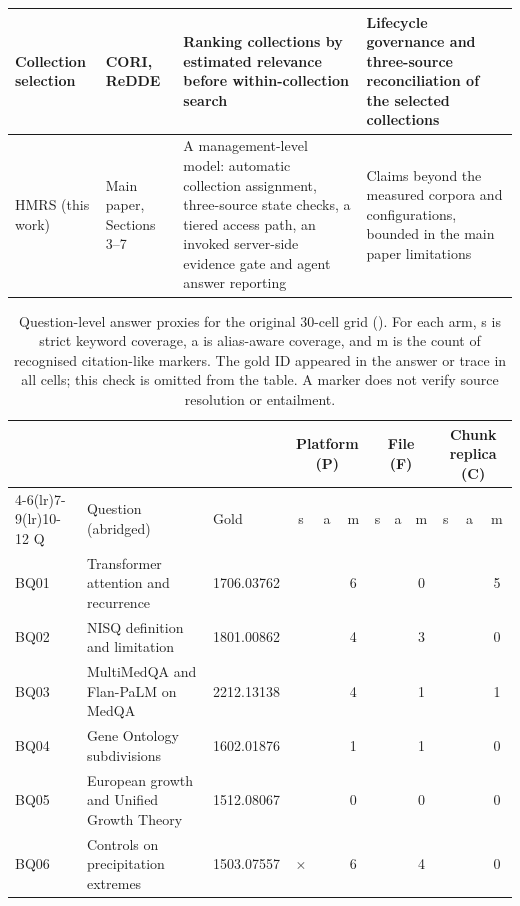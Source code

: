 \documentclass[final,5p,times,twocolumn]{elsarticle}
\newcommand{\yes}{\checkmark}\newcommand{\no}{--}
\begin{document}
\begin{table}[t]
\begin{tabular}{@{}>{\raggedright\arraybackslash}p{}>{\raggedright\arraybackslash}p{}>{\raggedright\arraybackslash}p{}>{\raggedright\arraybackslash}p{}@{}}
Collection selection & CORI, ReDDE & Ranking collections by estimated relevance before within-collection search & Lifecycle governance and three-source reconciliation of the selected collections\\
\midrule
HMRS (this work) & Main paper, Sections 3--7 & A management-level model: automatic collection assignment, three-source state checks, a tiered access path, an invoked server-side evidence gate and agent answer reporting & Claims beyond the measured corpora and configurations, bounded in the main paper limitations\\
\bottomrule
\end{tabular}
\end{table}

\begin{table}[t]
\centering
\small
\setlength{\tabcolsep}{3pt}
\caption{Question-level answer proxies for the original 30-cell grid
(\protect{}). For each arm, s is strict
keyword coverage, a is alias-aware coverage, and m is the count of
recognised citation-like markers. The gold ID appeared in the answer or
trace in all cells; this check is omitted from the table. A marker does not
verify source resolution or entailment.}
\label{tab:s-answer-grid}
\begin{tabular}{@{}l>{\raggedright\arraybackslash}p{}l*{9}{c}@{}}
\toprule
 & & & \multicolumn{3}{c}{Platform (P)} & \multicolumn{3}{c}{File (F)} & \multicolumn{3}{c}{Chunk replica (C)}\\
\cmidrule(lr){4-6}\cmidrule(lr){7-9}\cmidrule(lr){10-12}
Q & Question (abridged) & Gold & s & a & m & s & a & m & s & a & m\\
\midrule
BQ01 & Transformer attention and recurrence & 1706.03762 & \yes & \yes & 6 & \yes & \yes & 0 & \yes & \yes & 5\\
BQ02 & NISQ definition and limitation & 1801.00862 & \yes & \yes & 4 & \yes & \yes & 3 & \yes & \yes & 0\\
BQ03 & MultiMedQA and Flan-PaLM on MedQA & 2212.13138 & \yes & \yes & 4 & \yes & \yes & 1 & \yes & \yes & 1\\
BQ04 & Gene Ontology subdivisions & 1602.01876 & \yes & \yes & 1 & \yes & \yes & 1 & \yes & \yes & 0\\
BQ05 & European growth and Unified Growth Theory & 1512.08067 & \yes & \yes & 0 & \yes & \yes & 0 & \yes & \yes & 0\\
BQ06 & Controls on precipitation extremes & 1503.07557 & $\times$ & \yes & 6 & \yes & \yes & 4 & \yes & \yes & 0\\

\end{tabular}
\end{table}
\end{document}
